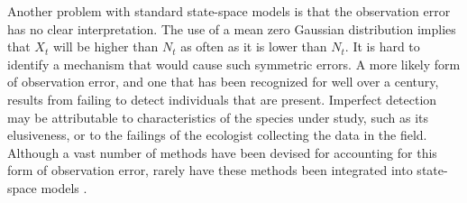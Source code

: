 \documentclass[12pt]{article}
\begin{document}
Another problem with standard state-space models is that the
observation error has no clear interpretation. The use of a mean zero
Gaussian distribution implies that $X_t$ will be
higher than $N_t$ as often as it is lower than $N_t$. It is hard
to identify a mechanism that would cause such symmetric errors. A more likely
form of observation error, and one that has been recognized for well
over a century, results from failing to detect individuals that are
present. Imperfect detection may be attributable to
characteristics of the species under study, such as its elusiveness,
or to the failings of the ecologist collecting the data in the field.
Although a vast number of methods have been devised for accounting for
this form of observation error, rarely have these methods been
integrated into state-space models \citep[but
see][]{buckland_etal:2004}.
\end{document}
